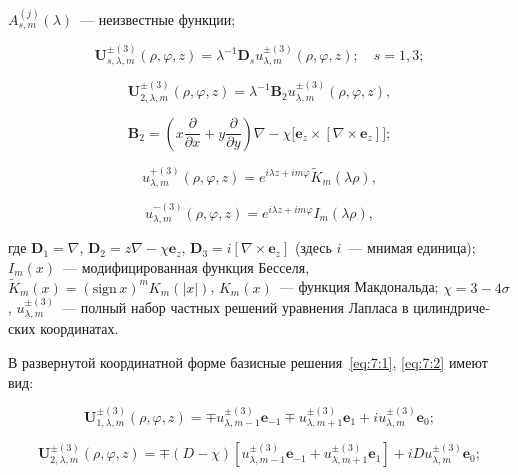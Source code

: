\begin{russian}
\noindent $A_{s,m}^{(j)}(\lambda )$~--- неизвестные функции;

\begin{equation}
\mathbf{U}_{s,\lambda,m}^{\pm(3)}(\rho,\varphi,z)=\lambda^{-1}\mathbf{D}_s u_{\lambda,m}^{\pm(3)}(\rho,\varphi,z);\quad s=1,3;
\label{eq:7:1}
\end{equation}

\begin{equation}
\mathbf{U}_{2,\lambda,m}^{\pm(3)}(\rho,\varphi,z)=\lambda^{-1}\mathbf{B}_2 u_{\lambda,m}^{\pm(3)}(\rho,\varphi,z),
\label{eq:7:2}
\end{equation}

\begin{equation}
\mathbf{B}_2=\left(x\frac{\partial}{\partial x}+y\frac{\partial}{\partial y}\right)\nabla-\chi\Big[\mathbf{e}_z\times[\nabla\times\mathbf{e}_z]\Big];
\end{equation}

\begin{equation*}
u_{\lambda,m}^{+(3)}(\rho,\varphi,z)=e^{i\lambda z+im\varphi}\tilde K_m(\lambda\rho),
\end{equation*}

\begin{equation*}
u_{\lambda,m}^{-(3)}(\rho,\varphi,z)=e^{i\lambda z+im\varphi}I_m(\lambda\rho),
\end{equation*}

\noindent где $\mathbf{D}_1=\nabla$, $\mathbf{D}_2=z\nabla-\chi\mathbf{e}_z$, $\mathbf{D}_3=i[\nabla\times\mathbf{e}_z]$ (здесь $i$~--- мнимая единица); $I_m(x)$~--- модифицированная функция Бесселя, $\tilde K_m(x)=(\mathrm{sign}\,x)^m K_m(|x|)$, $K_m(x)$~--- функция Макдональда; $\chi=3-4\sigma$, $u_{\lambda,m}^{\pm(3)}$~--- полный набор частных решений уравнения Лапласа в цилиндрических координатах.

В развернутой координатной форме базисные решения~\eqref{eq:7:1}, \eqref{eq:7:2} имеют вид:

\begin{equation}
\mathbf{U}_{1,\lambda,m}^{\pm(3)}(\rho,\varphi,z)=\mp u_{\lambda,m-1}^{\pm(3)}\mathbf{e}_{-1}\mp u_{\lambda,m+1}^{\pm(3)}\mathbf{e}_1+iu_{\lambda,m}^{\pm(3)}\mathbf{e}_0;
\label{eq:7:4}
\end{equation}

\begin{equation}
\mathbf{U}_{2,\lambda,m}^{\pm(3)}(\rho,\varphi,z)=\mp(D-\chi)\left[u_{\lambda,m-1}^{\pm(3)}\mathbf{e}_{-1}+
u_{\lambda,m+1}^{\pm(3)}\mathbf{e}_1\right]+iDu_{\lambda,m}^{\pm(3)}\mathbf{e}_0;
\label{eq:7:5}
\end{equation}


\end{russian}
